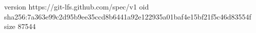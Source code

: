 version https://git-lfs.github.com/spec/v1
oid sha256:7a363e99c2d95b9ee35ccd8b6441a92e122935a01baf4e15bf21f5c46d83554f
size 87544
